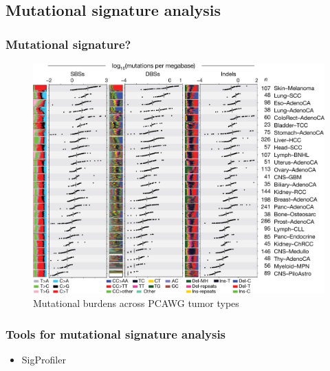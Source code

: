 \documentclass{beamer}
\begin{document}
        \subsection{Mutational signature analysis}
            \begin{frame}
                \frametitle{Mutational signature?}

                \begin{figure}
                    \includegraphics[width=0.6 \linewidth]{figures/LungCancer/signatures.jpg}
                    \caption{Mutational burdens across PCAWG tumor types \protect\cite{signature-02}}
                \end{figure}
            \end{frame}

            \begin{frame}
                \frametitle{Tools for mutational signature analysis}

                \begin{itemize}
                    \item SigProfiler \cite{signature-02}
                \end{itemize}
            \end{frame}
\end{document}
